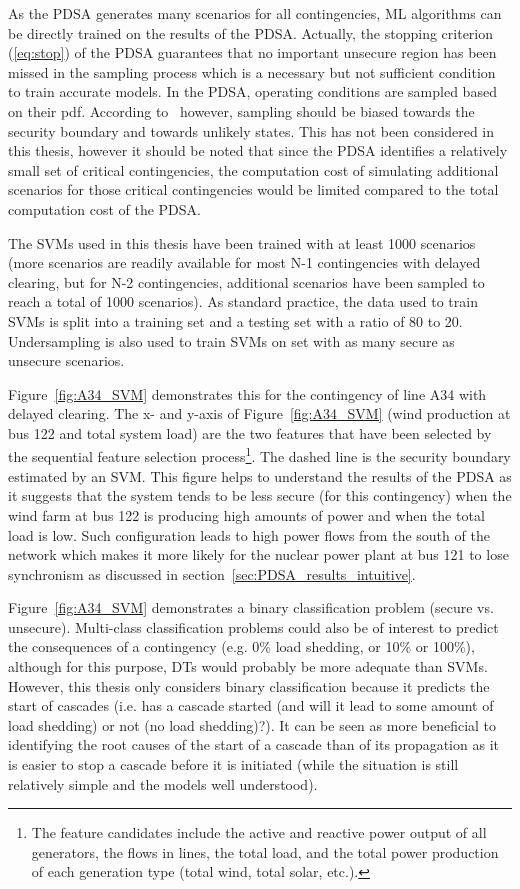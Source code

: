 As the PDSA generates many scenarios for all contingencies, ML algorithms can be directly trained on the results of the PDSA. Actually, the stopping criterion (\ref{eq:stop}) of the PDSA guarantees that no important unsecure region has been missed in the sampling process which is a necessary but not sufficient condition to train accurate models. In the PDSA, operating conditions are sampled based on their pdf. According to~\cite{Bugaje} however, sampling should be biased towards the security boundary and towards unlikely states. This has not been considered in this thesis, however it should be noted that since the PDSA identifies a relatively small set of critical contingencies, the computation cost of simulating additional scenarios for those critical contingencies would be limited compared to the total computation cost of the PDSA.

The SVMs used in this thesis have been trained with at least 1000 scenarios (more scenarios are readily available for most N-1 contingencies with delayed clearing, but for N-2 contingencies, additional scenarios have been sampled to reach a total of 1000 scenarios). As standard practice, the data used to train SVMs is split into a training set and a testing set with a ratio of 80 to 20. Undersampling is also used to train SVMs on set with as many secure as unsecure scenarios.

Figure~\ref{fig:A34_SVM} demonstrates this for the contingency of line A34 with delayed clearing. The x- and y-axis of Figure~\ref{fig:A34_SVM} (wind production at bus 122 and total system load) are the two features that have been selected by the sequential feature selection process\footnote{The feature candidates include the active and reactive power output of all generators, the flows in lines, the total load, and the total power production of each generation type (total wind, total solar, etc.).}. The dashed line is the security boundary estimated by an SVM. This figure helps to understand the results of the PDSA as it suggests that the system tends to be less secure (for this contingency) when the wind farm at bus 122 is producing high amounts of power and when the total load is low. Such configuration leads to high power flows from the south of the network which makes it more likely for the nuclear power plant at bus 121 to lose synchronism as discussed in section~\ref{sec:PDSA_results_intuitive}.

Figure~\ref{fig:A34_SVM} demonstrates a binary classification problem (secure vs. unsecure). Multi-class classification problems could also be of interest to predict the consequences of a contingency (e.g. 0\% load shedding, or 10\% or 100\%), although for this purpose, DTs would probably be more adequate than SVMs. However, this thesis only considers binary classification because it predicts the start of cascades (i.e. has a cascade started (and will it lead to some amount of load shedding) or not (no load shedding)?). It can be seen as more beneficial to identifying the root causes of the start of a cascade than of its propagation as it is easier to stop a cascade before it is initiated (while the situation is still relatively simple and the models well understood).

